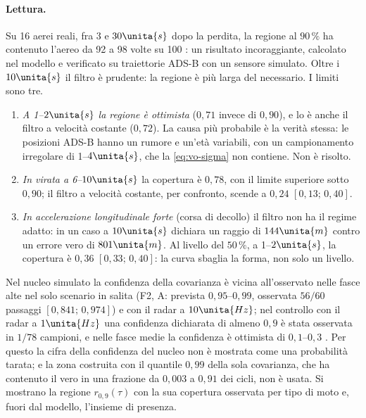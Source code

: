 \paragraph{Lettura.} Su 16 aerei reali, fra $3$ e $30\unita{s}$ dopo la perdita, la regione al $90\,\%$ ha contenuto l'aereo da 92 a 98 volte su 100 : un risultato incoraggiante, calcolato nel modello e verificato su traiettorie ADS-B con un sensore simulato. Oltre i $10\unita{s}$ il filtro è prudente: la regione è più larga del necessario. I limiti sono tre.
\begin{enumerate}[label=\arabic*.]
\item \emph{A 1--$2\unita{s}$ la regione è ottimista} ($0{,}71$ invece di $0{,}90$), e lo è anche il filtro a velocità costante ($0{,}72$). La causa più probabile è la verità stessa: le posizioni ADS-B hanno un rumore e un'età variabili, con un campionamento irregolare di 1--$4\unita{s}$, che la \eqref{eq:vo-sigma} non contiene. Non è risolto.
\item \emph{In virata a 6--$10\unita{s}$} la copertura è $0{,}78$, con il limite superiore sotto $0{,}90$; il filtro a velocità costante, per confronto, scende a $0{,}24$ $[0{,}13;\,0{,}40]$.
\item \emph{In accelerazione longitudinale forte} (corsa di decollo) il filtro non ha il regime adatto: in un caso a $10\unita{s}$ dichiara un raggio di $144\unita{m}$ contro un errore vero di $801\unita{m}$. Al livello del $50\,\%$, a 1--$2\unita{s}$, la copertura è $0{,}36$ $[0{,}33;\,0{,}40]$: la curva sbaglia la forma, non solo un livello.
\end{enumerate}
Nel nucleo simulato la confidenza della covarianza è vicina all'osservato nelle fasce alte nel solo scenario in salita (F2, A: prevista $0{,}95$--$0{,}99$, osservata $56/60$ passaggi $[0{,}841;\,0{,}974]$) e con il radar a $10\unita{Hz}$; nel controllo con il radar a $1\unita{Hz}$ una confidenza dichiarata di almeno $0{,}9$ è stata osservata in $1/78$ campioni, e nelle fasce medie la confidenza è ottimista di $0{,}1$--$0{,}3$ . Per questo la cifra della confidenza del nucleo non è mostrata come una probabilità tarata; e la zona costruita con il quantile $0{,}99$ della sola covarianza, che ha contenuto il vero in una frazione da $0{,}003$ a $0{,}91$ dei cicli, non è usata. Si mostrano la regione $r_{0,9}(\tau)$ con la sua copertura osservata per tipo di moto e, fuori dal modello, l'insieme di presenza.
